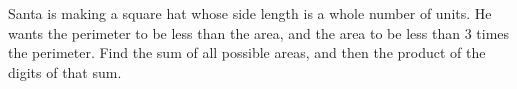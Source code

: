 Santa is making a square hat whose side length is a whole number of units. He wants the perimeter to be less than the area, and the area to be less than $3$ times the perimeter. Find the sum of all possible areas, and then the product of the digits of that sum.
